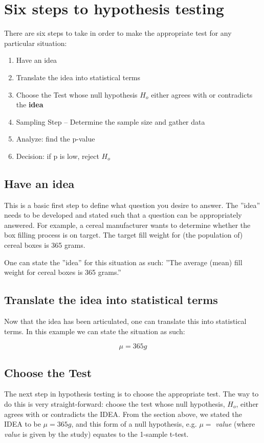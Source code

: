 \section{Six steps to hypothesis testing}
There are six steps to take in order to make the appropriate test for any particular situation:
\begin{enumerate}
\item Have an idea
\item Translate the idea into statistical terms
\item Choose the Test whose null hypothesis $ H_{o} $ either agrees with or contradicts the \textbf{idea}
\item Sampling Step -- Determine the sample size and gather data
\item Analyze: find the p-value 
\item Decision: if p is low, reject $ H_{o} $
\end{enumerate}

\subsection{Have an idea}

This is a basic first step to define what question you desire to answer.  The ''idea'' needs to be developed and stated such that a question can be appropriately answered.  For example, a cereal manufacturer wants to determine whether the box filling process is on target.  The target fill weight for (the population of) cereal boxes is 365 grams.

One can state the ''idea'' for this situation as such: ''The average (mean) fill weight for cereal boxes is 365 grams.''

\subsection{Translate the idea into statistical terms}

Now that the idea has been articulated, one can translate this into statistical terms.  In this example we can state the situation as such:

\begin{center}
\begin{equation}
\mu = 365 g
\end{equation}
\end{center}


\subsection{Choose the Test}
The next step in hypothesis testing is to choose the appropriate test.  The way to do this is very straight-forward:  choose the test whose null hypothesis, $H_{o}$, either agrees with or contradicts the IDEA.  From the section above, we stated the IDEA to be $ \mu = 365 g $, and this form of a null hypothesis, e.g. $ \mu = $ \textit{value} (where \textit{value} is given by the study) equates to the 1-sample t-test.  




